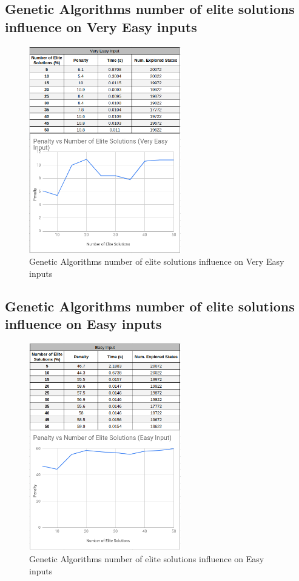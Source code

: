 \documentclass[conference]{IEEEtran}
\begin{document}
\subsection{Genetic Algorithms number of elite solutions influence on Very Easy inputs}

\begin{figure}[H]
    \centerline{\includegraphics[width=250px]{elite_very_easy.png}}
    \caption{Genetic Algorithms number of elite solutions influence on Very Easy inputs}
\end{figure}

\subsection{Genetic Algorithms number of elite solutions influence on Easy inputs}

\begin{figure}[H]
    \centerline{\includegraphics[width=250px]{elite_easy.png}}
    \caption{Genetic Algorithms number of elite solutions influence on Easy inputs}
\end{figure}
\end{document}
